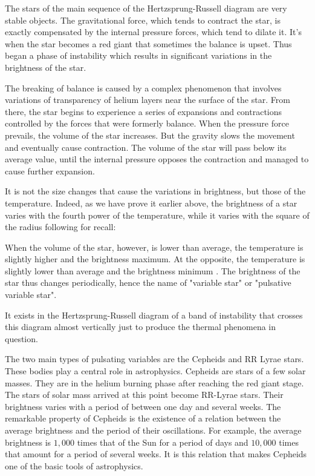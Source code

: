 	The stars of the main sequence of the Hertzsprung-Russell diagram are very stable objects. The gravitational force, which tends to contract the star, is exactly compensated by the internal pressure forces, which tend to dilate it. It's when the star becomes a red giant that sometimes the balance is upset. Thus began a phase of instability which results in significant variations in the brightness of the star.

	The breaking of balance is caused by a complex phenomenon that involves variations of transparency of helium layers near the surface of the star. From there, the star begins to experience a series of expansions and contractions controlled by the forces that were formerly balance. When the pressure force prevails, the volume of the star increases. But the gravity slows the movement and eventually cause contraction. The volume of the star will pass below its average value, until the internal pressure opposes the contraction and managed to cause further expansion.

	It is not the size changes that cause the variations in brightness, but those of the temperature. Indeed, as we have prove it earlier above, the brightness of a star varies with the fourth power of the temperature, while it varies with the square of the radius following for recall:
	
	When the volume of the star, however, is lower than average, the temperature is slightly higher and the brightness maximum. At the opposite, the temperature is slightly lower than average and the brightness minimum . The brightness of the star thus changes periodically, hence the name of "variable star" or "pulsative variable star".

	It exists in the Hertzsprung-Russell diagram of a band of instability that crosses this diagram almost vertically just to produce the thermal phenomena in question.

	The two main types of pulsating variables are the Cepheids and RR Lyrae stars. These bodies play a central role in astrophysics. Cepheids are stars of a few solar masses. They are in the helium burning phase after reaching the red giant stage. The stars of solar mass arrived at this point become RR-Lyrae stars. Their brightness varies with a period of between one day and several weeks. The remarkable property of Cepheids is the existence of a relation between the average brightness and the period of their oscillations. For example, the average brightness is $1,000$ times that of the Sun for a period of days and $10,000$ times that amount for a period of several weeks. It is this relation that makes Cepheids one of the basic tools of astrophysics.
	
